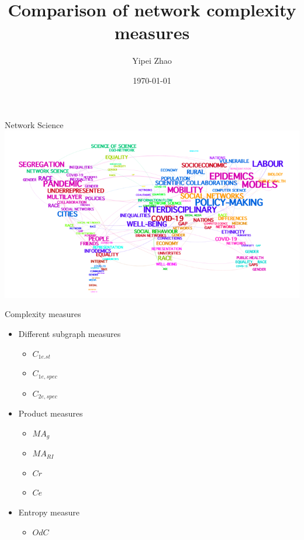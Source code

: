 \documentclass{beamer}
\title{Comparison of network complexity measures}
\author{Yipei Zhao}
\institute{Aston University}
\date{\today}
\begin{document}
    \frame{\titlepage}
    \begin{frame}{Network Science}
        \centering
        \includegraphics[width=\textwidth]{v1.png}
    \end{frame}


    \begin{frame}{Complexity measures}
        \begin{itemize}
            \item Different subgraph measures
            \begin{itemize}
                \item $C_{1e.st}$
                \item $C_{1e,spec}$
                \item $C_{2e,spec}$
            \end{itemize}
            \item Product measures
            \begin{itemize}
                \item $MA_g$
                \item $MA_{RI}$
                \item $Cr$
                \item $Ce$
            \end{itemize}
            \item Entropy measure
            \begin{itemize}
                \item $OdC$
            \end{itemize}
        \end{itemize}
    \end{frame}
\end{document}
